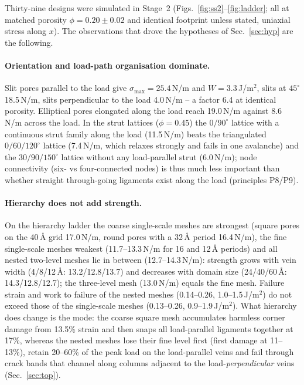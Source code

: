 Thirty-nine designs were simulated in Stage~2 (Figs.~\ref{fig:ss2}--\ref{fig:ladder}; all at matched porosity $\phi=0.20\pm0.02$ and identical footprint unless stated, uniaxial stress along $x$). The observations that drove the hypotheses of Sec.~\ref{sec:hyp} are the following.

\paragraph{Orientation and load-path organisation dominate.} Slit pores parallel to the load give $\sigma_\mathrm{max}=25.4$\,N/m and $W=3.3$\,J/m$^2$, slits at $45^\circ$ 18.5\,N/m, slits perpendicular to the load 4.0\,N/m -- a factor 6.4 at identical porosity. Elliptical pores elongated along the load reach 19.0\,N/m against 8.6\,N/m across the load. In the strut lattices ($\phi=0.45$) the $0/90^\circ$ lattice with a continuous strut family along the load (11.5\,N/m) beats the triangulated $0/60/120^\circ$ lattice (7.4\,N/m, which relaxes strongly and fails in one avalanche) and the $30/90/150^\circ$ lattice without any load-parallel strut (6.0\,N/m); node connectivity (six- vs four-connected nodes) is thus much less important than whether straight through-going ligaments exist along the load (principles P8/P9).

\paragraph{Hierarchy does not add strength.} On the hierarchy ladder the coarse single-scale meshes are strongest (square pores on the 40\,\AA{} grid 17.0\,N/m, round pores with a 32\,\AA{} period 16.4\,N/m), the fine single-scale meshes weakest (11.7--13.3\,N/m for 16 and 12\,\AA{} periods) and all nested two-level meshes lie in between (12.7--14.3\,N/m): strength grows with vein width (4/8/12\,\AA: 13.2/12.8/13.7) and decreases with domain size (24/40/60\,\AA: 14.3/12.8/12.7); the three-level mesh (13.0\,N/m) equals the fine mesh. Failure strain and work to failure of the nested meshes (0.14--0.26, 1.0--1.5\,J/m$^2$) do not exceed those of the single-scale meshes (0.13--0.26, 0.9--1.9\,J/m$^2$). What hierarchy does change is the mode: the coarse square mesh accumulates harmless corner damage from 13.5\% strain and then snaps all load-parallel ligaments together at 17\%, whereas the nested meshes lose their fine level first (first damage at 11--13\%), retain 20--60\% of the peak load on the load-parallel veins and fail through crack bands that channel along columns adjacent to the load-\emph{perpendicular} veins (Sec.~\ref{sec:top}).

